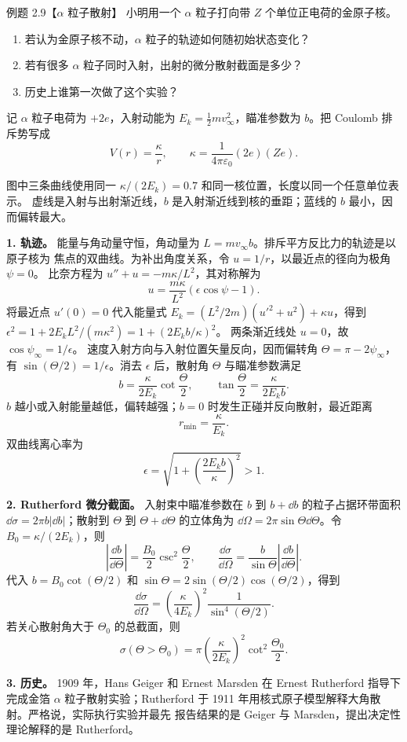 \begin{origexamplebox}{例题 2.9【$\alpha$ 粒子散射】}
小明用一个 $\alpha$ 粒子打向带 $Z$ 个单位正电荷的金原子核。
\begin{enumerate}[label=\arabic*.]
  \item 若认为金原子核不动，$\alpha$ 粒子的轨迹如何随初始状态变化？
  \item 若有很多 $\alpha$ 粒子同时入射，出射的微分散射截面是多少？
  \item 历史上谁第一次做了这个实验？
\end{enumerate}
\end{origexamplebox}

\begin{xesolution}
记 $\alpha$ 粒子电荷为 $+2e$，入射动能为 $E_k=\tfrac12mv_\infty^2$，瞄准参数为 $b$。把 Coulomb
排斥势写成
\[
  V(r)=\frac{\kappa}{r},
  \qquad
  \kappa=\frac{1}{4\pi\varepsilon_0}(2e)(Ze).
\]

\rutherfordFigure
图中三条曲线使用同一 $\kappa/(2E_k)=0.7$ 和同一核位置，长度以同一个任意单位表示。
虚线是入射与出射渐近线，$b$ 是入射渐近线到核的垂距；蓝线的 $b$ 最小，因而偏转最大。


\textbf{1. 轨迹。} 能量与角动量守恒，角动量为 $L=mv_\infty b$。排斥平方反比力的轨迹是以原子核为
焦点的双曲线。为补出角度关系，令 $u=1/r$，以最近点的径向为极角 $\psi=0$。
比奈方程为 $u''+u=-m\kappa/L^2$，其对称解为
\[
 u=\frac{m\kappa}{L^2}(\epsilon\cos\psi-1).
\]
将最近点 $u'(0)=0$ 代入能量式
$E_k=(L^2/2m)(u'^2+u^2)+\kappa u$，得到
$\epsilon^2=1+2E_kL^2/(m\kappa^2)=1+(2E_kb/\kappa)^2$。
两条渐近线处 $u=0$，故 $\cos\psi_\infty=1/\epsilon$。
速度入射方向与入射位置矢量反向，因而偏转角
$\Theta=\pi-2\psi_\infty$，有
$\sin(\Theta/2)=1/\epsilon$。消去 $\epsilon$ 后，散射角 $\Theta$ 与瞄准参数满足
\[
  \boxed{b=\frac{\kappa}{2E_k}\cot\frac\Theta2},
  \qquad
  \boxed{\tan\frac\Theta2=\frac{\kappa}{2E_kb}}.
\]
$b$ 越小或入射能量越低，偏转越强；$b=0$ 时发生正碰并反向散射，最近距离
\[
  \boxed{r_{\min}=\frac{\kappa}{E_k}}.
\]
双曲线离心率为
\[
  \epsilon=\sqrt{1+\left(\frac{2E_kb}{\kappa}\right)^2}>1.
\]

\textbf{2. Rutherford 微分截面。} 入射束中瞄准参数在 $b$ 到 $b+\dd b$ 的粒子占据环带面积
$\dd\sigma=2\pi b|\dd b|$；散射到 $\Theta$ 到 $\Theta+\dd\Theta$ 的立体角为
$\dd\Omega=2\pi\sin\Theta\dd\Theta$。令 $B_0=\kappa/(2E_k)$，则
\[
 \left|\frac{\dd b}{\dd\Theta}\right|=\frac{B_0}{2}\csc^2\frac\Theta2,
 \qquad \frac{\dd\sigma}{\dd\Omega}=
 \frac{b}{\sin\Theta}\left|\frac{\dd b}{\dd\Theta}\right|.
\]
代入 $b=B_0\cot(\Theta/2)$ 和 $\sin\Theta=2\sin(\Theta/2)\cos(\Theta/2)$，得到
\[
  \boxed{\frac{\dd\sigma}{\dd\Omega}
  =\left(\frac{\kappa}{4E_k}\right)^2
  \frac{1}{\sin^4(\Theta/2)}}.
\]
若关心散射角大于 $\Theta_0$ 的总截面，则
\[
  \boxed{\sigma(\Theta>\Theta_0)
  =\pi\left(\frac{\kappa}{2E_k}\right)^2
  \cot^2\frac{\Theta_0}{2}}.
\]

\textbf{3. 历史。} 1909 年，Hans Geiger 和 Ernest Marsden 在 Ernest Rutherford 指导下完成金箔
$\alpha$ 粒子散射实验；Rutherford 于 1911 年用核式原子模型解释大角散射。严格说，实际执行实验并最先
报告结果的是 Geiger 与 Marsden，提出决定性理论解释的是 Rutherford。
\end{xesolution}
